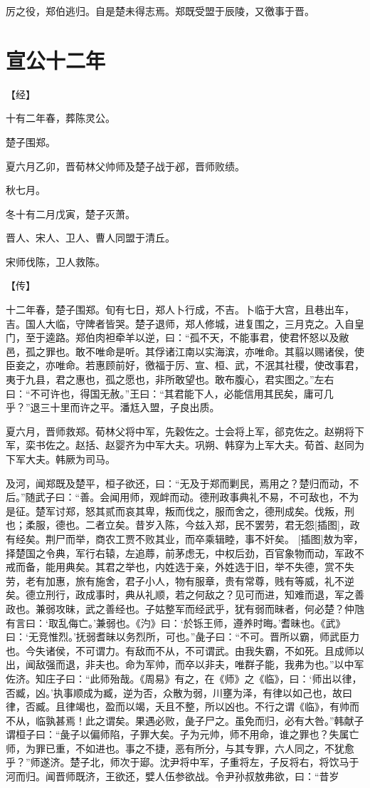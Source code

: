 \documentclass[a4paper,12pt,UTF8,twoside]{ctexbook}
\begin{document}
厉之役，郑伯逃归。自是楚未得志焉。郑既受盟于辰陵，又徼事于晋。


\section{宣公十二年}


【经】

十有二年春，葬陈灵公。

楚子围郑。

夏六月乙卯，晋荀林父帅师及楚子战于邲，晋师败绩。

秋七月。

冬十有二月戊寅，楚子灭萧。

晋人、宋人、卫人、曹人同盟于清丘。

宋师伐陈，卫人救陈。

【传】

十二年春，楚子围郑。旬有七日，郑人卜行成，不吉。卜临于大宫，且巷出车，吉。国人大临，守陴者皆哭。楚子退师，郑人修城，进复围之，三月克之。入自皇门，至于逵路。郑伯肉袒牵羊以逆，曰：“孤不天，不能事君，使君怀怒以及敝邑，孤之罪也。敢不唯命是听。其俘诸江南以实海滨，亦唯命。其翦以赐诸侯，使臣妾之，亦唯命。若惠顾前好，徼福于厉、宣、桓、武，不泯其社稷，使改事君，夷于九县，君之惠也，孤之愿也，非所敢望也。敢布腹心，君实图之。”左右曰：“不可许也，得国无赦。”王曰：“其君能下人，必能信用其民矣，庸可几乎？”退三十里而许之平。潘尪入盟，子良出质。

夏六月，晋师救郑。荀林父将中军，先穀佐之。士会将上军，郤克佐之。赵朔将下军，栾书佐之。赵括、赵婴齐为中军大夫。巩朔、韩穿为上军大夫。荀首、赵同为下军大夫。韩厥为司马。

及河，闻郑既及楚平，桓子欲还，曰：“无及于郑而剿民，焉用之？楚归而动，不后。”随武子曰：“善。会闻用师，观衅而动。德刑政事典礼不易，不可敌也，不为是征。楚军讨郑，怒其贰而哀其卑，叛而伐之，服而舍之，德刑成矣。伐叛，刑也；柔服，德也。二者立矣。昔岁入陈，今兹入郑，民不罢劳，君无怨[插图]，政有经矣。荆尸而举，商农工贾不败其业，而卒乘辑睦，事不奸矣。 [插图]敖为宰，择楚国之令典，军行右辕，左追蓐，前茅虑无，中权后劲，百官象物而动，军政不戒而备，能用典矣。其君之举也，内姓选于亲，外姓选于旧，举不失德，赏不失劳，老有加惠，旅有施舍，君子小人，物有服章，贵有常尊，贱有等威，礼不逆矣。德立刑行，政成事时，典从礼顺，若之何敌之？见可而进，知难而退，军之善政也。兼弱攻昧，武之善经也。子姑整军而经武乎，犹有弱而昧者，何必楚？仲虺有言曰：‘取乱侮亡。’兼弱也。《汋》曰：‘於铄王师，遵养时晦。’耆昧也。《武》曰：‘无竞惟烈。’抚弱耆昧以务烈所，可也。”彘子曰：“不可。晋所以霸，师武臣力也。今失诸侯，不可谓力。有敌而不从，不可谓武。由我失霸，不如死。且成师以出，闻敌强而退，非夫也。命为军帅，而卒以非夫，唯群子能，我弗为也。”以中军佐济。知庄子曰：“此师殆哉。《周易》有之，在《师》之《临》，曰：‘师出以律，否臧，凶。’执事顺成为臧，逆为否，众散为弱，川壅为泽，有律以如己也，故曰律，否臧。且律竭也，盈而以竭，夭且不整，所以凶也。不行之谓《临》，有帅而不从，临孰甚焉！此之谓矣。果遇必败，彘子尸之。虽免而归，必有大咎。”韩献子谓桓子曰：“彘子以偏师陷，子罪大矣。子为元帅，师不用命，谁之罪也？失属亡师，为罪已重，不如进也。事之不捷，恶有所分，与其专罪，六人同之，不犹愈乎？”师遂济。楚子北，师次于郔。沈尹将中军，子重将左，子反将右，将饮马于河而归。闻晋师既济，王欲还，嬖人伍参欲战。令尹孙叔敖弗欲，曰：“昔岁
\end{document}
